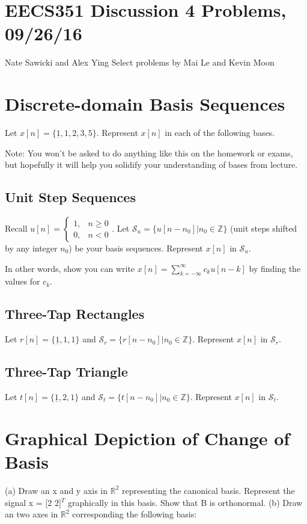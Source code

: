 \documentclass[11pt]{article}
\begin{document}
\section*{EECS351 Discussion 4 Problems, 09/26/16}
Nate Sawicki and Alex Ying \newline
Select problems by Mai Le and Kevin Moon


\section{Discrete-domain Basis Sequences}
Let $x[n] = \{\underline{1},1,2,3,5\}$. Represent $x[n]$ in each of the following bases. 

Note: You won't be asked to do anything like this on the homework or exams, but hopefully it will help you solidify your understanding of bases from lecture.

\subsection*{Unit Step Sequences}
Recall $u[n] = \begin{cases}1, & n \geq 0\\ 0, & n < 0 \end{cases}$. Let $\mathcal{S}_u = \{u[n-n_0]|n_0 \in \mathbb{Z}\}$ (unit steps shifted by any integer $n_0$) be your basis sequences. Represent $x[n]$ in $\mathcal{S}_u$.

In other words, show you can write $x[n]=\sum\limits_{k=-\infty}^\infty c_k u[n-k]$ by finding the values for $c_k$.

\subsection*{Three-Tap Rectangles}
Let $r[n] = \{\underline{1},1,1\}$ and $\mathcal{S}_r = \{r[n-n_0]|n_0 \in \mathbb{Z}\}$. Represent $x[n]$ in $\mathcal{S}_r$.

\subsection*{Three-Tap Triangle}
Let $t[n] = \{\underline{1},2,1\}$ and $\mathcal{S}_t = \{t[n-n_0]|n_0 \in \mathbb{Z}\}$. Represent $x[n]$ in $\mathcal{S}_t$.





\newpage


\section{Graphical Depiction of Change of Basis}
(a) Draw an x and y axis in $ \mathbb{R}^2 $ representing the canonical basis. Represent the signal x = [2 2]$^{T}$ graphically in this basis.
Show that B is orthonormal.\newline
(b) Draw an two axes in $ \mathbb{R}^2 $ corresponding the following basis:
\end{document}
